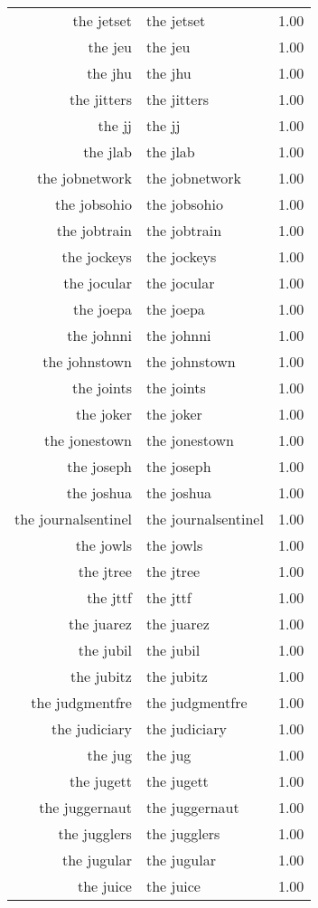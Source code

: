 \begin{table}[ht]
\begin{tabular}{rlr}
  the jetset & the jetset & 1.00 \\ 
  the jeu & the jeu & 1.00 \\ 
  the jhu & the jhu & 1.00 \\ 
  the jitters & the jitters & 1.00 \\ 
  the jj & the jj & 1.00 \\ 
  the jlab & the jlab & 1.00 \\ 
  the jobnetwork & the jobnetwork & 1.00 \\ 
  the jobsohio & the jobsohio & 1.00 \\ 
  the jobtrain & the jobtrain & 1.00 \\ 
  the jockeys & the jockeys & 1.00 \\ 
  the jocular & the jocular & 1.00 \\ 
  the joepa & the joepa & 1.00 \\ 
  the johnni & the johnni & 1.00 \\ 
  the johnstown & the johnstown & 1.00 \\ 
  the joints & the joints & 1.00 \\ 
  the joker & the joker & 1.00 \\ 
  the jonestown & the jonestown & 1.00 \\ 
  the joseph & the joseph & 1.00 \\ 
  the joshua & the joshua & 1.00 \\ 
  the journalsentinel & the journalsentinel & 1.00 \\ 
  the jowls & the jowls & 1.00 \\ 
  the jtree & the jtree & 1.00 \\ 
  the jttf & the jttf & 1.00 \\ 
  the juarez & the juarez & 1.00 \\ 
  the jubil & the jubil & 1.00 \\ 
  the jubitz & the jubitz & 1.00 \\ 
  the judgmentfre & the judgmentfre & 1.00 \\ 
  the judiciary & the judiciary & 1.00 \\ 
  the jug & the jug & 1.00 \\ 
  the jugett & the jugett & 1.00 \\ 
  the juggernaut & the juggernaut & 1.00 \\ 
  the jugglers & the jugglers & 1.00 \\ 
  the jugular & the jugular & 1.00 \\ 
  the juice & the juice & 1.00 \\ 

\end{tabular}
\end{table}
